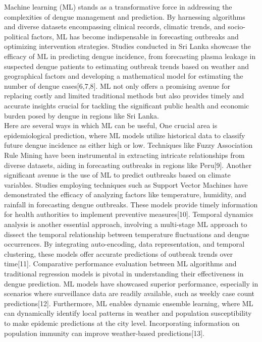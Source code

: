 \documentclass[conference]{IEEEtran}
\begin{document}
Machine learning (ML) stands as a transformative force in addressing the complexities
of dengue management and prediction. By harnessing algorithms and diverse datasets encompassing
clinical records, climatic trends, and socio-political factors, ML has become
indispensable in forecasting outbreaks and optimizing intervention strategies. Studies
conducted in Sri Lanka showcase the efficacy of ML in predicting dengue incidence,
from forecasting plasma leakage in suspected dengue patients to estimating outbreak
trends based on weather and geographical factors and developing a mathematical model
for estimating the number of dengue cases[6,7,8]. ML not only offers a promising
avenue for replacing costly and limited traditional methods but also provides timely
and accurate insights crucial for tackling the significant public health and economic burden
posed by dengue in regions like Sri Lanka. \\

Here are several ways in which ML can be useful,
One crucial area is epidemiological prediction, where ML models utilize historical data
to classify future dengue incidence as either high or low. Techniques like Fuzzy
Association Rule Mining have been instrumental in extracting intricate relationships
from diverse datasets, aiding in forecasting outbreaks in regions like Peru[9].
Another significant avenue is the use of ML to predict outbreaks based on climate variables.
Studies employing techniques such as Support Vector Machines have demonstrated the
efficacy of analyzing factors like temperature, humidity, and rainfall in forecasting
dengue outbreaks. These models provide timely information for health authorities to
implement preventive measures[10]. Temporal dynamics analysis is another essential
approach, involving a multi-stage ML approach to dissect the temporal relationship between
temperature fluctuations and dengue occurrences. By integrating auto-encoding, data representation,
and temporal clustering, these models offer accurate predictions of outbreak trends over time[11].
Comparative performance evaluation between ML algorithms and traditional regression
models is pivotal in understanding their effectiveness in dengue prediction. ML
models have showcased superior performance, especially in scenarios where surveillance
data are readily available, such as weekly case count predictions[12]. Furthermore, ML
enables dynamic ensemble learning, where ML can dynamically identify local patterns in weather
and population susceptibility to make epidemic predictions at the city level. Incorporating information
on population immunity can improve weather-based predictions[13]. \\
\end{document}
